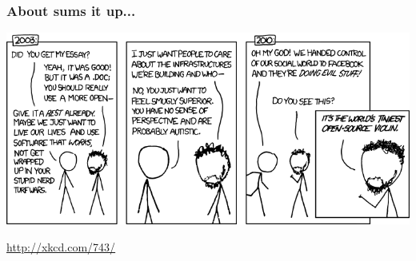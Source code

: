 \documentclass{beamer}
\begin{document}
\begin{frame}
  \frametitle{About sums it up...}
  \begin{center}\includegraphics[width=1\textwidth]{../img/violin}\end{center}
  \begin{footnotesize}
    \textcolor{beamer@myblue}{\href{http://xkcd.com/743/}{http://xkcd.com/743/}}
  \end{footnotesize}
\end{frame}


\end{document}
